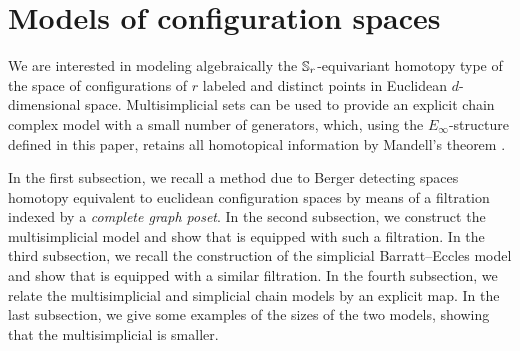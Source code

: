 
\section{Models of configuration spaces}

We are interested in modeling algebraically the $\mathbb{S}_r$-equivariant homotopy type of the space of configurations of $r$ labeled and distinct points in Euclidean $d$-dimensional space.
Multisimplicial sets can be used to provide an explicit chain complex model with a small number of generators, which, using the $E_\infty$-structure defined in this paper, retains all homotopical information by Mandell's theorem \cite{mandell2006homotopy_type}.

In the first subsection, we recall a method due to Berger detecting spaces homotopy equivalent to euclidean configuration spaces by means of a filtration indexed by a {\em complete graph poset}.
In the second subsection, we construct the multisimplicial model and show that is equipped with such a filtration.
In the third subsection, we recall the construction of the simplicial Barratt--Eccles model and show that is equipped with a similar filtration.
In the fourth subsection, we relate the multisimplicial and simplicial chain models by an explicit map. In the last subsection, we give some examples of the sizes of the two models, showing that the multisimplicial is smaller.





